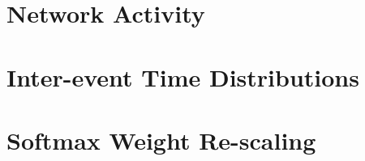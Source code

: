\section{Network Activity}
\label{sec:network-activity}




\section{Inter-event Time Distributions}
\label{sec:inter-event-time-dists}




\section{Softmax Weight Re-scaling}
\label{sec:softmax-rescaling}
